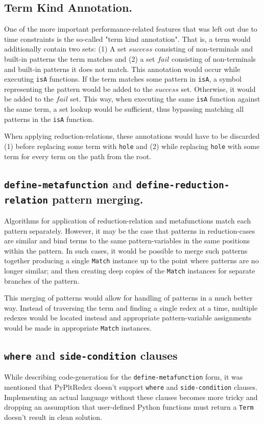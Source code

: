 \subsection{Term Kind Annotation.}
One of the more important performance-related features that was left out due to time constraints is the so-called "term kind annotation". That is, a term would additionally contain two sets: (1) A set $success$ consisting of non-terminals and built-in patterns the term matches and (2) a set $fail$ consisting of non-terminals and built-in patterns it does not match. This annotation would occur while executing \texttt{isA} functions. If the term matches some pattern in \texttt{isA}, a symbol representing the pattern would be added to the $success$ set. Otherwise, it would be added to the $fail$ set. This way, when executing the same \texttt{isA} function against the same term, a set lookup would be sufficient, thus bypassing matching all patterns in the \texttt{isA} function.

When applying reduction-relations, these annotations would have to be discarded (1) before replacing some term with \texttt{hole} and (2) while replacing \texttt{hole} with some term for every term on the path from the root.


\subsection{\texttt{define-metafunction} and \texttt{define-reduction-relation} pattern merging.}

Algorithms for application of reduction-relation and metafunctions match each pattern separately. However, it may be the case that patterns in reduction-cases are similar and bind terms to the same pattern-variables in the same positions within the pattern. In such cases, it would be possible to merge such patterns together producing a single \texttt{Match} instance up to the point where patterns are no longer similar; and then creating deep copies of the \texttt{Match} instances for separate branches of the pattern.

This merging of patterns would allow for handling of \PatternInHoleNoArg \space patterns in a much better way. Instead of traversing the term and finding a single redex at a time, multiple redexes would be located instead and appropriate pattern-variable assignments would be made in appropriate \texttt{Match} instances.

\subsection{\texttt{where} and \texttt{side-condition} clauses}
While describing code-generation for the \texttt{define-metafunction} form, it was mentioned that PyPltRedex doesn't support \texttt{where} and \texttt{side-condition} clauses. Implementing an actual language without these clauses becomes more tricky and dropping an assumption that user-defined Python functions must return a \texttt{Term} doesn't result in clean solution.


